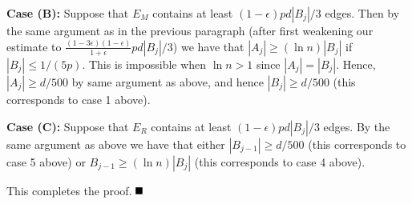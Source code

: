 \documentclass[11pt]{article}
\newcommand{\qed}{\mbox{}\hspace*{\fill}\nolinebreak\mbox{$\rule{0.6em}{0.6em}$}
}
\newcommand{\e}{{\epsilon}}
\newenvironment{proofof}[1]{\noindent{\bf Proof of #1:}}{$\qed$\par}
\begin{document}
\begin{proofof}{Lemma \ref{lm:main}}
\textbf{Case (B):} Suppose that $E_M$ contains at least $(1-\e)pd|B_j|/3$ edges. Then by the same argument as in the previous paragraph (after first weakening our estimate to $\frac{(1-3\e)(1-\e)}{1+\e} pd|B_j|/3$) we have that $|A_{j}|\geq (\ln n) |B_j|$ if $|B_j|\leq 1/(5p)$. This is impossible when $\ln n>1$ since $|A_j|=|B_j|$. Hence, $|A_{j}|\geq d/500$ by same argument as above, and hence $|B_j|\geq d/500$ (this corresponds to case 1 above). 

\textbf{Case (C):} Suppose that $E_R$ contains at least $(1-\e)pd|B_j|/3$ edges.  By the same argument as above we have that either $|B_{j-1}|\geq d/500$ (this corresponds to case 5 above) or $B_{j-1}\geq (\ln n) |B_j|$ (this corresponds to case 4 above).

This completes the proof.
\end{proofof}
\end{document}
